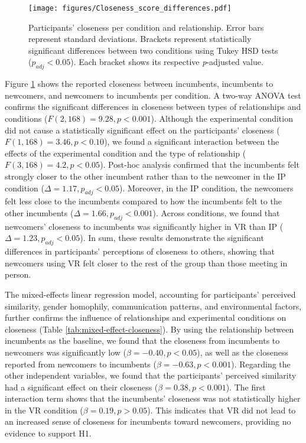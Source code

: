 \begin{figure}[!hbt]
    \centering
    \texttt{[image: figures/Closeness\_score\_differences.pdf]}
    \caption{Participants' closeness per condition and relationship. Error bars represent standard deviations. Brackets represent statistically significant differences between two conditions using Tukey HSD tests ($p_{adj} < 0.05$). Each bracket shows its respective \textit{p}-adjusted value.}
    \label{fig:closeness-score-condition}
\end{figure}

Figure \ref{fig:closeness-score-condition} shows the reported closeness between incumbents, incumbents to newcomers, and newcomers to incumbents per condition. A two-way ANOVA test confirms the significant differences in closeness between types of relationships and conditions ($F(2,168)=9.28, p<0.001$). Although the experimental condition did not cause a statistically significant effect on the participants' closeness ($F(1,168)=3.46, p<0.10$), we found a significant interaction between the effects of the experimental condition and the type of relationship ($F(3,168)=4.2, p<0.05$). Post-hoc analysis confirmed that the incumbents felt strongly closer to the other incumbent rather than to the newcomer in the IP condition ($\Delta=1.17, p_{adj}<0.05$). Moreover, in the IP condition, the newcomers felt less close to the incumbents compared to how the incumbents felt to the other incumbents ($\Delta = 1.66, p_{adj} < 0.001$). Across conditions, we found that newcomers' closeness to incumbents was significantly higher in VR than IP ($\Delta=1.23, p_{adj}<0.05$). In sum, these results demonstrate the significant differences in participants' perceptions of closeness to others, showing that newcomers using VR felt closer to the rest of the group than those meeting in person. 

The mixed-effects linear regression model, accounting for participants' perceived similarity, gender homophily, communication patterns, and environmental factors, further confirms the influence of relationships and experimental conditions on closeness (Table \ref{tab:mixed-effect-closeness}). By using the relationship between incumbents as the baseline, we found that the closeness from incumbents to newcomers was significantly low ($\beta=-0.40,p<0.05$), as well as the closeness reported from newcomers to incumbents ($\beta=-0.63,p<0.001$). Regarding the other independent variables, we found that the participants' perceived similarity had a significant effect on their closeness ($\beta=0.38,p<0.001$). The first interaction term shows that the incumbents' closeness was not statistically higher in the VR condition ($\beta=0.19,p>0.05$). This indicates that VR did not lead to an increased sense of closeness for incumbents toward newcomers, providing no evidence to support H1.

